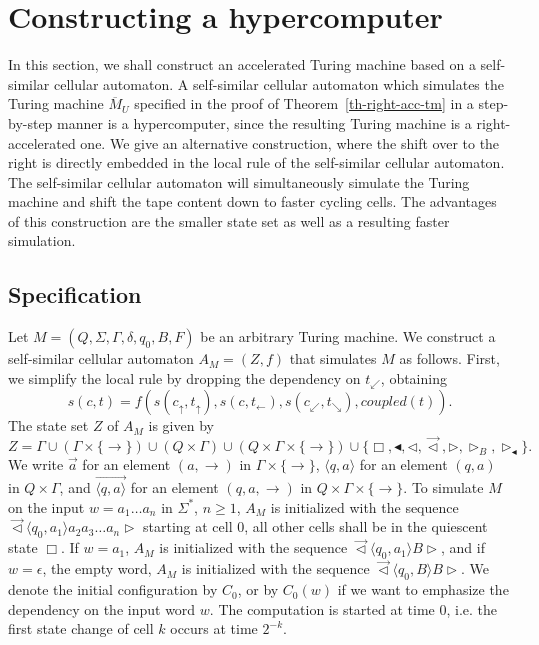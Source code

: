 \documentclass[pre,showpacs,showkeys,preprint]{revtex4}
\theoremstyle{definition}
\begin{document}
\section{Constructing a hypercomputer}
\label{chap:hypercomputer}
In this section, we shall construct an accelerated Turing machine based on a self-similar cellular automaton.
A self-similar cellular automaton which simulates the Turing machine $\overline{M}_U$ specified in the  proof of Theorem~\ref{th-right-acc-tm} in a
step-by-step manner is a hypercomputer, since the resulting Turing machine is a right-accelerated one.
We give an alternative construction, where the shift over to the right is directly embedded in the local rule of the self-similar cellular automaton.
The self-similar cellular automaton will simultaneously simulate the Turing machine and shift the tape content down
to faster cycling cells.
The advantages of this construction are the smaller state set as well as a resulting faster simulation.

\subsection{Specification}

Let $M = (Q, \Sigma, \Gamma, \delta, q_0, B, F)$ be an arbitrary Turing machine.
We construct a self-similar cellular automaton $A_M = (Z, f)$ that simulates $M$ as follows.
First, we simplify the local rule by dropping the dependency on $t_\swarrow$, obtaining
\begin{equation}
s(c,t) =
f(
        s(c_\uparrow, t_\uparrow),
        s(c, t_\leftarrow),
        s(c_\swarrow, t_\searrow),
        \mathit{coupled}(t)
).
\end{equation}
The state set $Z$ of $A_M$ is given by
\[
Z = \Gamma \cup (\Gamma \times \{\rightarrow\}) \cup (Q \times \Gamma)
\cup (Q \times \Gamma \times \{\rightarrow\}) \cup
\{\Box, \blacktriangleleft, \lhd, \overrightarrow{\lhd}, \rhd, \rhd_B, \rhd_\blacktriangleleft\}.
\]
We write $\overrightarrow{a}$ for an element $(a, \rightarrow)$ in $\Gamma \times \{\rightarrow\}$,
$\langle q,a \rangle$ for an element
$(q, a)$ in $Q \times \Gamma$, and
$\overrightarrow{\langle q,a \rangle}$ for an element
$(q, a, \rightarrow)$ in $Q \times \Gamma \times \{\rightarrow\}$.
To simulate $M$ on the input $w=a_1 \ldots a_n$ in $\Sigma^*$, $n \geq 1$,
$A_M$ is initialized with the sequence
$\overrightarrow{\lhd} \langle q_0,a_1 \rangle a_2 a_3\ldots a_n\rhd $
starting at cell 0, all other cells shall be in the quiescent state $\Box$.
If $w=a_1$, $A_M$ is initialized with the sequence
$\overrightarrow{\lhd} \langle q_0,a_1 \rangle B\rhd $, and
if $w=\epsilon$, the empty word, $A_M$ is initialized with the sequence
$\overrightarrow{\lhd} \langle q_0,B \rangle B\rhd $.
We denote the initial configuration by $C_0$, or by $C_0(w)$ if we want to emphasize the dependency on the input word $w$.
The computation is started at time 0, i.e. the first state change of cell $k$ occurs at time $2^{-k}$.
\end{document}
